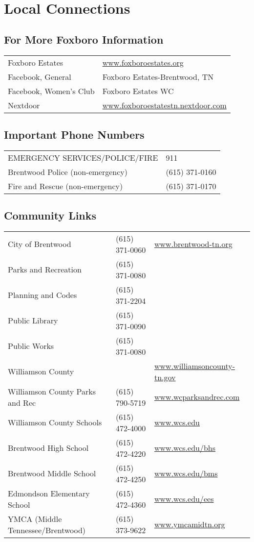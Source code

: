 \section{Local Connections}

\subsection{For More Foxboro Information}

\begin{tabular}{ll}  
Foxboro Estates & \url{www.foxboroestates.org} \\
Facebook, General & Foxboro Estates-Brentwood, TN \\
Facebook, Women’s Club & Foxboro Estates WC \\
Nextdoor & \url{www.foxboroestatestn.nextdoor.com} \\
\end{tabular}


\subsection{Important Phone Numbers}
\begin{tabular}{ll}  
EMERGENCY SERVICES/POLICE/FIRE & 911 \\
Brentwood Police (non-emergency) & (615) 371-0160 \\
Fire and Rescue (non-emergency) & (615) 371-0170 \\
\end{tabular}

\subsection{Community Links}

\begin{tabular}{lll}
City of Brentwood & (615) 371-0060 & \url{www.brentwood-tn.org} \\
Parks and Recreation & (615) 371-0080 & \\
Planning and Codes & (615) 371-2204 & \\
Public Library & (615) 371-0090 & \\
Public Works & (615) 371-0080 & \\
Williamson County & & \url{www.williamsoncounty-tn.gov} \\
Williamson County Parks and Rec & (615) 790-5719 & \url{www.wcparksandrec.com} \\
Williamson County Schools & (615) 472-4000 & \url{www.wcs.edu} \\
Brentwood High School & (615) 472-4220 & \url{www.wcs.edu/bhs} \\
Brentwood Middle School & (615) 472-4250 & \url{www.wcs.edu/bms} \\
Edmondson Elementary School & (615) 472-4360 & \url{www.wcs.edu/ees} \\
YMCA (Middle Tennessee/Brentwood) & (615) 373-9622 & \url{www.ymcamidtn.org} \\
\end{tabular}
			
